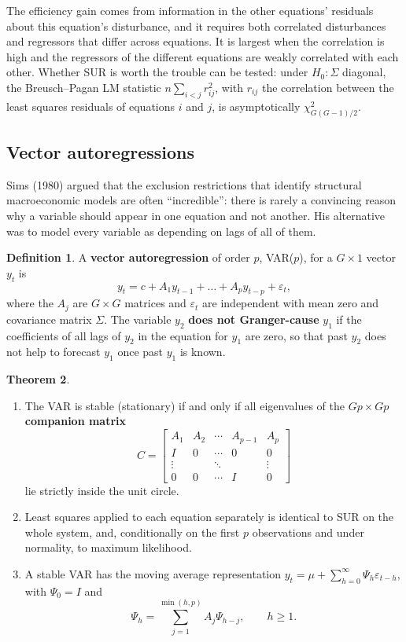 \documentclass[11pt,a4paper]{article}
\numberwithin{equation}{section}
\theoremstyle{definition}
\newtheorem{thm}{Theorem}[subsection]
\newtheorem{defn}[thm]{Definition}
\begin{document}
The efficiency gain comes from information in the other equations' residuals about this equation's disturbance, and it requires both correlated
disturbances and regressors that differ across equations. It is largest when the correlation is high and the regressors of the different equations
are weakly correlated with each other. Whether SUR is worth the trouble can be tested: under $H_0\colon\Sigma$ diagonal, the Breusch--Pagan LM statistic
$n\sum_{i<j}r_{ij}^2$, with $r_{ij}$ the correlation between the least squares residuals of equations $i$ and $j$, is asymptotically $\chi^2_{G(G-1)/2}$.

\subsection{Vector autoregressions}
\label{ssec:var}

Sims (1980) argued that the exclusion restrictions that identify structural macroeconomic models are often ``incredible'': there is rarely a
convincing reason why a variable should appear in one equation and not another. His alternative was to model every variable as depending on lags of
all of them.

\begin{defn}
A \textbf{vector autoregression} of order $p$, VAR($p$), for a $G \times 1$ vector $y_t$ is
\[
y_t = c + A_1y_{t-1} + \dots + A_py_{t-p} + \varepsilon_t,
\]
where the $A_j$ are $G \times G$ matrices and $\varepsilon_t$ are independent with mean zero and covariance matrix $\Sigma$. The variable $y_2$ \textbf{does not
Granger-cause} $y_1$ if the coefficients of all lags of $y_2$ in the equation for $y_1$ are zero, so that past $y_2$ does not help to forecast $y_1$ once
past $y_1$ is known.
\end{defn}

\begin{thm}
\label{thm:var}
\begin{enumerate}[label=(\roman*)]
\item The VAR is stable (stationary) if and only if all eigenvalues of the $Gp \times Gp$ \textbf{companion matrix}
\[
C = \begin{bmatrix}
A_1 & A_2 & \cdots & A_{p-1} & A_p\\
I & 0 & \cdots & 0 & 0\\
\vdots & & \ddots & & \vdots\\
0 & 0 & \cdots & I & 0
\end{bmatrix}
\]
lie strictly inside the unit circle.
\item Least squares applied to each equation separately is identical to SUR on the whole system, and, conditionally on the first $p$ observations
and under normality, to maximum likelihood.
\item A stable VAR has the moving average representation $y_t = \mu + \sum_{h=0}^\infty\Psi_h\varepsilon_{t-h}$, with $\Psi_0 = I$ and
\[
\Psi_h = \sum_{j=1}^{\min(h, p)}A_j\Psi_{h-j}, \qquad h \geq 1 .
\]
\end{enumerate}
\end{thm}
\end{document}

